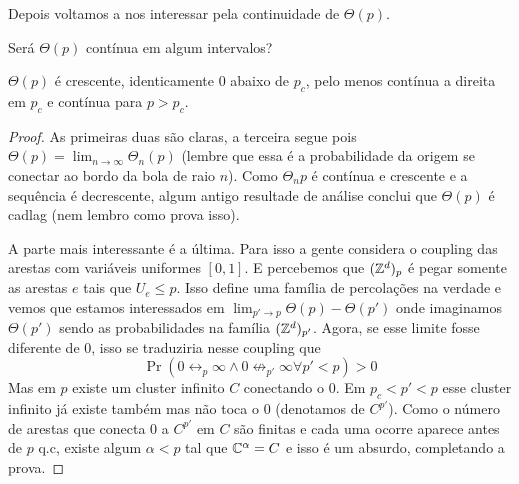 Depois voltamos a nos interessar pela continuidade de $\Theta(p)$.
\begin{question}
	Será $\Theta(p)$ contínua em algum intervalos?
\end{question}
\begin{theorem}
	$\Theta(p)$ é crescente, identicamente 0 abaixo de $p_c$,
	pelo menos contínua a direita em $p_c$ e contínua para $p>p_c$.
\end{theorem}
\begin{proof}
	As primeiras duas são claras, a terceira segue pois $\Theta(p) =
	\lim_{n \to \infty} \Theta_n(p)$ (lembre que essa é a probabilidade
	da origem se conectar ao bordo da bola de raio $n$). Como
	$\Theta_n{p}$ é contínua e crescente e a sequência
	é decrescente, algum antigo resultade de análise conclui que
	$\Theta(p)$ é cadlag (nem lembro como prova isso).

	A parte mais interessante é a última. Para isso a gente considera o
	coupling das arestas com variáveis uniformes $[0,1]$.
	E percebemos que $(\mathbb{Z}^d)_p$ é pegar somente as arestas $e$ tais que
	$U_e \leq p$. Isso define uma família de percolações na verdade
	e vemos que estamos interessados em $\lim_{p'\to p} \Theta(p) -
	\Theta(p')$ onde imaginamos $\Theta(p')$ sendo as probabilidades na
	família $(\mathbb{Z}^d)_{p'}$.
	Agora, se esse limite fosse diferente de $0$, isso se traduziria
	nesse coupling que
	\[
		\Pr(0 \leftrightarrow_p \infty \land 0 \not \leftrightarrow_{p'}
		\infty \forall p'<p) > 0
	\]
	Mas em $p$ existe um cluster infinito $C$ conectando o $0$. Em $p_c
	< p' < p$ esse cluster infinito já existe também mas não toca o $0$
	(denotamos de $C^{p'}$).
	Como o número de arestas que conecta $0$ a $C^{p'}$ em $C$ são
	finitas e cada uma ocorre aparece antes de $p$ q.c, existe algum
	$\alpha < p$ tal que $\mathbb{C}^{\alpha} = C$
	e isso é um absurdo, completando a prova.
\end{proof}
